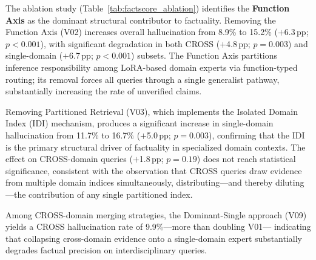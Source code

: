 The ablation study (Table~\ref{tab:factscore_ablation}) identifies the
\textbf{Function Axis} as the dominant structural contributor to factuality.
Removing the Function Axis (V02) increases overall hallucination from 8.9\%
to 15.2\% ($+$6.3\,pp; $p{<}0.001$), with significant degradation in both
CROSS ($+$4.8\,pp; $p{=}0.003$) and single-domain ($+$6.7\,pp; $p{<}0.001$)
subsets.
The Function Axis partitions inference responsibility among LoRA-based domain
experts via function-typed routing; its removal forces all queries through a
single generalist pathway, substantially increasing the rate of unverified
claims.

Removing Partitioned Retrieval (V03), which implements the Isolated Domain
Index (IDI) mechanism, produces a significant increase in single-domain
hallucination from 11.7\% to 16.7\% ($+$5.0\,pp; $p{=}0.003$), confirming
that the IDI is the primary structural driver of factuality in specialized
domain contexts.
The effect on CROSS-domain queries ($+$1.8\,pp; $p{=}0.19$) does not reach
statistical significance, consistent with the observation that CROSS queries
draw evidence from multiple domain indices simultaneously, distributing---and
thereby diluting---the contribution of any single partitioned index.

Among CROSS-domain merging strategies, the Dominant-Single approach (V09)
yields a CROSS hallucination rate of 9.9\%---more than doubling V01---
indicating that collapsing cross-domain evidence onto a single-domain expert
substantially degrades factual precision on interdisciplinary queries.

